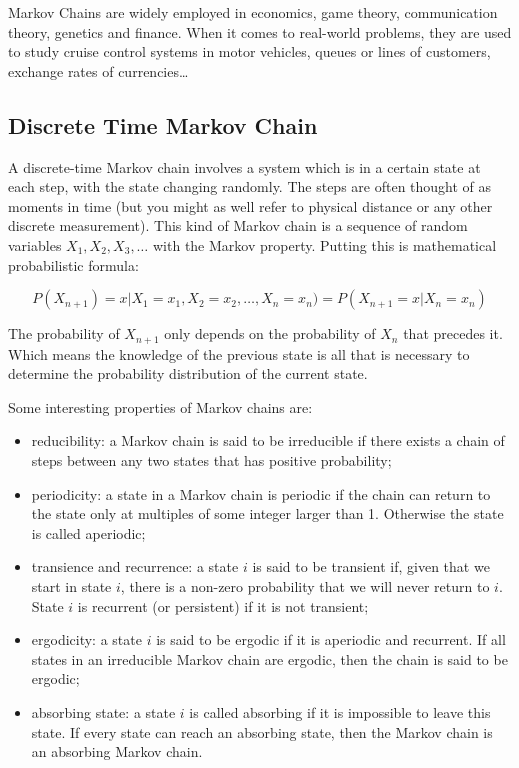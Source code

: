 Markov Chains are widely employed in economics, game theory, communication theory, genetics and finance. When it comes to real-world problems, they are used to study cruise control systems in motor vehicles, queues or lines of customers, exchange rates of currencies\ldots


\subsection{Discrete Time Markov Chain}
A discrete-time Markov chain involves a system which is in a certain state at each step, with the state changing randomly. The steps are often thought of as moments in time (but you might as well refer to physical distance or any other discrete measurement). This kind of Markov chain is a sequence of random variables $X_1, X_2, X_3,\ldots$ with the Markov property. Putting this is mathematical probabilistic formula:

\begin{equation}
P(X_{n+1}) = x | X_1 = x_1, X_2 = x_2, \ldots, X_n = x_n) = P( X_{n+1} = x | X_n = x_n)
\end{equation}

The probability of $X_{n+1}$ only depends on the probability of $X_n$ that precedes it. Which means the knowledge of the previous state is all that is necessary to determine the probability distribution of the current state.

\begin{attention}
Some interesting properties of Markov chains are:

\begin{itemize}
\tightlist
\item reducibility: a Markov chain is said to be irreducible if there exists a chain of steps between any two states that has positive probability;
\item periodicity: a state in a Markov chain is periodic if the chain can return to the state only at multiples of some integer larger than 1. Otherwise the state is called aperiodic;	
\item transience and recurrence: a state $i$ is said to be transient if, given that we start in state $i$, there is a non-zero probability that we will never return to $i$. State $i$ is recurrent (or persistent) if it is not transient;
\item ergodicity: a state $i$ is said to be ergodic if it is aperiodic and recurrent. If all states in an irreducible Markov chain are ergodic, then the chain is said to be ergodic;
\item absorbing state: a state $i$ is called absorbing if it is impossible to leave this state. If every state can reach an absorbing state, then the Markov chain is an absorbing Markov chain.
\end{itemize}
\end{attention}

